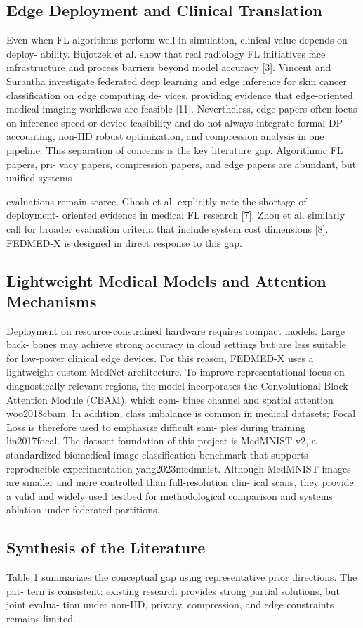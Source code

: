 \subsection{Edge Deployment and Clinical Translation}
Even when FL algorithms perform well in simulation, clinical value depends on deploy- ability. Bujotzek et al. show that real radiology FL initiatives face infrastructure and process barriers beyond model accuracy [3]. Vincent and Surantha investigate federated deep learning and edge inference for skin cancer classification on edge computing de- vices, providing evidence that edge-oriented medical imaging workflows are feasible [11].
Nevertheless, edge papers often focus on inference speed or device feasibility and do not always integrate formal DP accounting, non-IID robust optimization, and compression analysis in one pipeline.
This separation of concerns is the key literature gap. Algorithmic FL papers, pri- vacy papers, compression papers, and edge papers are abundant, but unified systems

evaluations remain scarce. Ghosh et al. explicitly note the shortage of deployment- oriented evidence in medical FL research [7]. Zhou et al. similarly call for broader evaluation criteria that include system cost dimensions [8]. FEDMED-X is designed in direct response to this gap.
\subsection{Lightweight Medical Models and Attention Mechanisms}
Deployment on resource-constrained hardware requires compact models. Large back- bones may achieve strong accuracy in cloud settings but are less suitable for low-power clinical edge devices. For this reason, FEDMED-X uses a lightweight custom MedNet architecture. To improve representational focus on diagnostically relevant regions, the model incorporates the Convolutional Block Attention Module (CBAM), which com- bines channel and spatial attention woo2018cbam. In addition, class imbalance is common in medical datasets; Focal Loss is therefore used to emphasize difficult sam- ples during training lin2017focal.
The dataset foundation of this project is MedMNIST v2, a standardized biomedical image classification benchmark that supports reproducible experimentation yang2023medmnist.
Although MedMNIST images are smaller and more controlled than full-resolution clin- ical scans, they provide a valid and widely used testbed for methodological comparison and systems ablation under federated partitions.
\subsection{Synthesis of the Literature}
Table 1 summarizes the conceptual gap using representative prior directions. The pat- tern is consistent: existing research provides strong partial solutions, but joint evalua- tion under non-IID, privacy, compression, and edge constraints remains limited.


